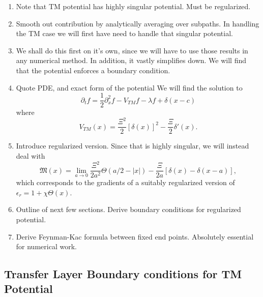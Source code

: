 \begin{enumerate}
  \item {Note that TM potential has highly singular potential.  Must be regularized.}
  \item Smooth out contribution by analytically averaging over subpaths.
    In handling the TM case we will first have need to handle that singular potential.
  \item We shall do this first on it's own, since we will have to use those results in any numerical method.
    In addition, it vastly simplifies down.
    We will find that the potential enforces a boundary condition.  

  \item Quote PDE, and exact form of the potential
    We will find the solution to 
    \begin{equation}
      \partial_t f = \frac{1}{2}\partial_x^2f -V_{TM} f - \lambda f + \delta(x-c)
    \end{equation}
    where 
    \begin{equation}
      V_{TM}(x) = \frac{\Xi^2}{2}[\delta(x)]^2 - \frac{\Xi}{2}\delta'(x).
    \end{equation}
  \item Introduce regularized version.  
    Since that is highly singular, we will instead deal with 
    \begin{equation}
      \mathfrak{M}(x) = \lim_{a\rightarrow 0} \frac{\Xi^2}{2a^2}\Theta(a/2-|x|) - \frac{\Xi}{2a}[\delta(x)-\delta(x-a)],
    \end{equation}
    which corresponds to the gradients of a suitably regularized version of $\epsilon_r = 1+\chi\Theta(x)$.  
  \item Outline of next few sections.  Derive boundary conditions for regularized potential.  
  \item Derive Feynman-Kac formula between fixed end points.  Absolutely essential for numerical
    work.
\end{enumerate}

\subsection{Transfer Layer Boundary conditions for TM Potential}

